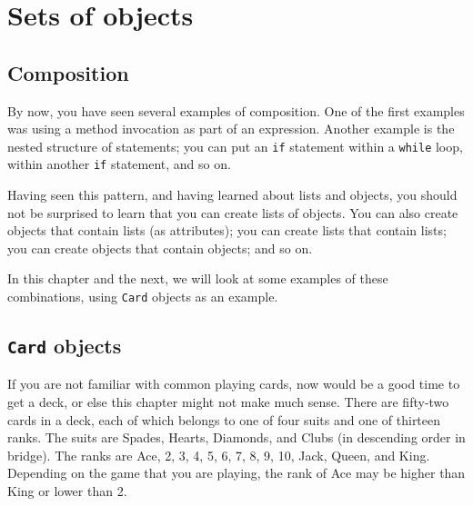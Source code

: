 


\chapter{Sets of objects}

\section{Composition}

By now, you have seen several examples of composition.
One of the
first examples was using a method invocation as part of an
expression.  Another example is the nested structure of statements;
you can put an {\tt if} statement within a {\tt while} loop, within
another {\tt if} statement, and so on.

Having seen this pattern, and having learned about lists and objects,
you should not be surprised to learn that you can create lists of
objects.  You can also create objects that contain lists (as
attributes); you can create lists that contain lists; you can
create objects that contain objects; and so on.

In this chapter and the next, we will look at some examples of these
combinations, using {\tt Card} objects as an example.


\section{{\tt Card} objects}

If you are not familiar with common playing cards, now would be a good
time to get a deck, or else this chapter might not make much sense.
There are fifty-two cards in a deck, each of which belongs to one of four
suits and one of thirteen ranks.  The suits are Spades, Hearts, Diamonds, and
Clubs (in descending order in bridge).  The ranks are Ace, 2, 3, 4, 5,
6, 7, 8, 9, 10, Jack, Queen, and King.  Depending on the game that you are
playing, the rank of Ace may be higher than King or lower than 2.

